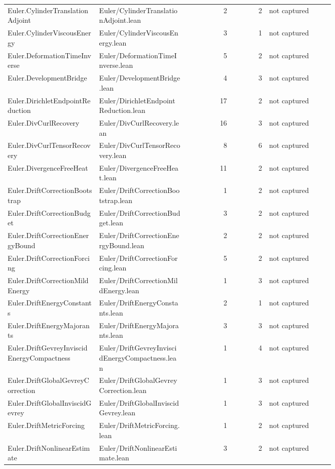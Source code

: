\documentclass[10pt]{article}
\begin{document}
\begin{longtable}{p{0.28\linewidth}p{0.27\linewidth}r r p{0.20\linewidth}}
Euler.CylinderTranslationAdjoint & Euler/CylinderTranslationAdjoint.lean & 2 & 2 & not captured\\
Euler.CylinderViscousEnergy & Euler/CylinderViscousEnergy.lean & 3 & 1 & not captured\\
Euler.DeformationTimeInverse & Euler/DeformationTimeInverse.lean & 5 & 2 & not captured\\
Euler.DevelopmentBridge & Euler/DevelopmentBridge.lean & 4 & 3 & not captured\\
Euler.DirichletEndpointReduction & Euler/DirichletEndpointReduction.lean & 17 & 2 & not captured\\
Euler.DivCurlRecovery & Euler/DivCurlRecovery.lean & 16 & 3 & not captured\\
Euler.DivCurlTensorRecovery & Euler/DivCurlTensorRecovery.lean & 8 & 6 & not captured\\
Euler.DivergenceFreeHeat & Euler/DivergenceFreeHeat.lean & 11 & 2 & not captured\\
Euler.DriftCorrectionBootstrap & Euler/DriftCorrectionBootstrap.lean & 1 & 2 & not captured\\
Euler.DriftCorrectionBudget & Euler/DriftCorrectionBudget.lean & 3 & 2 & not captured\\
Euler.DriftCorrectionEnergyBound & Euler/DriftCorrectionEnergyBound.lean & 2 & 2 & not captured\\
Euler.DriftCorrectionForcing & Euler/DriftCorrectionForcing.lean & 5 & 2 & not captured\\
Euler.DriftCorrectionMildEnergy & Euler/DriftCorrectionMildEnergy.lean & 1 & 3 & not captured\\
Euler.DriftEnergyConstants & Euler/DriftEnergyConstants.lean & 2 & 1 & not captured\\
Euler.DriftEnergyMajorants & Euler/DriftEnergyMajorants.lean & 3 & 3 & not captured\\
Euler.DriftGevreyInviscidEnergyCompactness & Euler/DriftGevreyInviscidEnergyCompactness.lean & 1 & 4 & not captured\\
Euler.DriftGlobalGevreyCorrection & Euler/DriftGlobalGevreyCorrection.lean & 1 & 3 & not captured\\
Euler.DriftGlobalInviscidGevrey & Euler/DriftGlobalInviscidGevrey.lean & 1 & 3 & not captured\\
Euler.DriftMetricForcing & Euler/DriftMetricForcing.lean & 1 & 2 & not captured\\
Euler.DriftNonlinearEstimate & Euler/DriftNonlinearEstimate.lean & 3 & 2 & not captured\\

\end{longtable}
\end{document}
